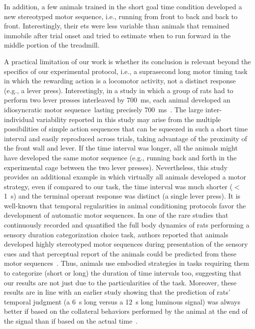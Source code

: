 In addition, a few animals trained in the short goal time condition developed a new stereotyped motor sequence, i.e., running from front to back and back to front.
Interestingly, their \glspl{et} were less variable than animals that remained immobile after trial onset and tried to estimate when to run forward in the middle portion of the treadmill.
\par
A practical limitation of our work is whether its conclusion is relevant beyond the specifics of our experimental protocol, i.e., a suprasecond long motor timing task in which the rewarding action is a locomotor activity, not a distinct response (e.g., a lever press).
Interestingly, in a study in which a group of rats had to perform two lever presses interleaved by 700~ms, each animal developed an idiosyncratic motor sequence\footnotemark\ lasting precisely 700~ms~\cite{Kawai2015}.
The large inter-individual variability reported in this study may arise from the multiple possibilities of simple action sequences that can be squeezed in such a short time interval and easily reproduced across trials, taking advantage of the proximity of the front wall and lever.
If the time interval was longer, all the animals might have developed the same motor sequence (e.g., running back and forth in the experimental cage between the two lever presses).
Nevertheless, this study provides an additional example in which virtually all animals developed a motor strategy, even if compared to our task, the time interval was much shorter ($<$1~s) and the terminal operant response was distinct (a single lever press).
It is well-known that temporal regularities in animal conditioning protocols favor the development of automatic motor sequences.
In one of the rare studies that continuously recorded and quantified the full body dynamics of rats performing a sensory duration categorization choice task, authors reported that animals developed highly stereotyped motor sequences during presentation of the sensory cues and that perceptual report of the animals could be predicted from these motor sequences~\cite{Gouvea2014}.
Thus, animals use embodied strategies in tasks requiring them to categorize (short or long) the duration of time intervals too, suggesting that our results are not just due to the particularities of the task.
Moreover, these results are in line with an earlier study showing that the prediction of rats' temporal judgment (a 6~s long versus a 12~s long luminous signal) was always better if based on the collateral behaviors performed by the animal at the end of the signal than if based on the actual time~\cite{Fetterman1998BehProc}.
